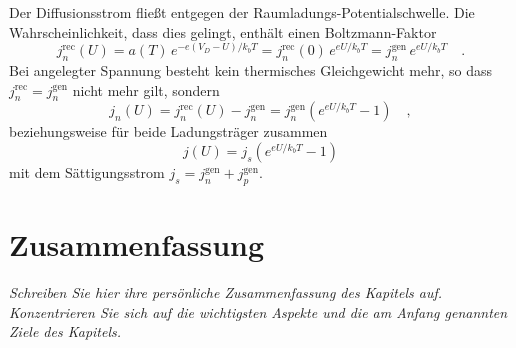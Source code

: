 Der Diffusionsstrom fließt entgegen der Raumladungs-Potentialschwelle. Die Wahrscheinlichkeit, dass dies gelingt, enthält einen Boltzmann-Faktor
\begin{equation}
    j_n^\text{rec}(U) = a(T) \, e^{-e (V_D - U) / k_b T} =  j_n^\text{rec}(0) \, e^{e U / k_b T}
    = j_n^\text{gen} \, e^{e U / k_b T}
    \quad .
\end{equation}
Bei angelegter Spannung besteht kein thermisches Gleichgewicht mehr, so dass $j_n^\text{rec} = j_n^\text{gen}$ nicht mehr gilt, sondern
\begin{equation}
    j_n(U) = j_n^\text{rec}(U) - j_n^\text{gen} = j_n^\text{gen} \left(  e^{e U / k_b T} - 1 \right) \quad ,
\end{equation}
beziehungsweise für beide Ladungsträger zusammen 
\begin{equation}
    j(U) =  j_s \left(  e^{e U / k_b T} - 1 \right)
\end{equation}
mit dem Sättigungsstrom $j_s = j_n^\text{gen}  + j_p^\text{gen} $.


\section{Zusammenfassung}

\textit{Schreiben Sie hier ihre persönliche Zusammenfassung des Kapitels auf. Konzentrieren Sie sich auf die wichtigsten Aspekte und die am Anfang genannten Ziele des Kapitels.}

\vspace*{10cm}

\printbibliography[segment=\therefsegment,heading=subbibliography]
